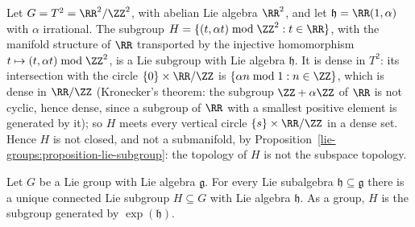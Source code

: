 \begin{example}\label{lie-groups:example-irrational-line}
Let $G = T^2 = \RR^2/\ZZ^2$, with abelian Lie algebra $\RR^2$, and let $\mathfrak{h} = \RR(1, \alpha)$ with $\alpha$ irrational. The subgroup
$H = \{(t, \alpha t) \bmod \ZZ^2 : t \in \RR\}$, with the manifold structure of $\RR$ transported by the injective homomorphism $t \mapsto (t, \alpha t) \bmod \ZZ^2$, is a
Lie subgroup with Lie algebra $\mathfrak{h}$. It is dense in $T^2$: its intersection with the circle $\{0\} \times \RR/\ZZ$ is $\{\alpha n \bmod 1 : n \in \ZZ\}$, which is dense
in $\RR/\ZZ$ (Kronecker's theorem: the subgroup $\ZZ + \alpha\ZZ$ of $\RR$ is not cyclic, hence dense, since a subgroup of $\RR$ with a smallest positive element is
generated by it); so $H$ meets every vertical circle $\{s\} \times \RR/\ZZ$ in a dense set. Hence $H$ is not closed, and not a submanifold, by
Proposition~\ref{lie-groups:proposition-lie-subgroup}: the topology of $H$ is not the subspace topology.
\end{example}

\begin{theorem}\label{lie-groups:theorem-subalgebras-subgroups}
Let $G$ be a Lie group with Lie algebra $\mathfrak{g}$. For every Lie subalgebra $\mathfrak{h} \subseteq \mathfrak{g}$ there is a unique connected Lie subgroup $H \subseteq G$
with Lie algebra $\mathfrak{h}$. As a group, $H$ is the subgroup generated by $\exp(\mathfrak{h})$.
\end{theorem}

